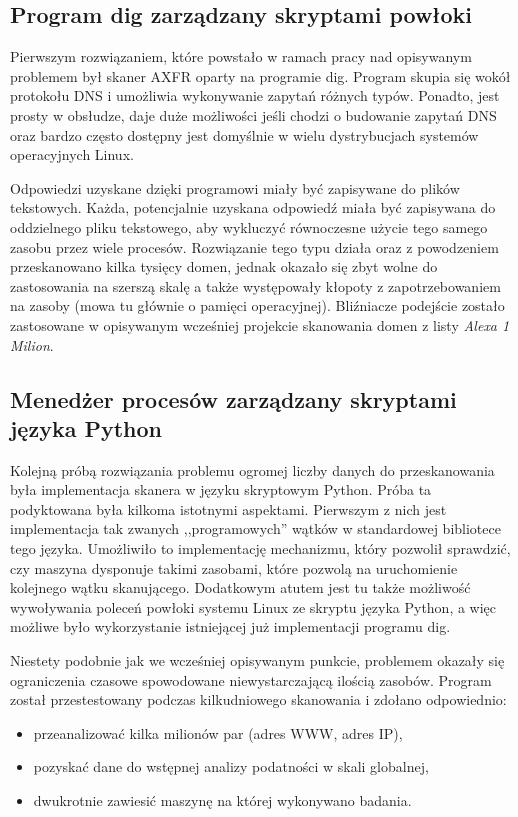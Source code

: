 \subsection{Program dig zarządzany skryptami powłoki}
Pierwszym rozwiązaniem, które powstało w ramach pracy nad opisywanym problemem był skaner AXFR oparty na programie dig\cite{isc}. Program skupia się wokół protokołu DNS i umożliwia wykonywanie zapytań różnych typów\cite{Liu:2006:DB:1197828}. Ponadto, jest prosty w obsłudze, daje duże możliwości jeśli chodzi o budowanie zapytań DNS oraz bardzo często dostępny jest domyślnie w wielu dystrybucjach systemów operacyjnych Linux. 

Odpowiedzi uzyskane dzięki programowi miały być zapisywane do plików tekstowych. Każda, potencjalnie uzyskana odpowiedź miała być zapisywana do oddzielnego pliku tekstowego, aby wykluczyć równoczesne użycie tego samego zasobu przez wiele procesów. Rozwiązanie tego typu działa oraz z powodzeniem przeskanowano kilka tysięcy domen, jednak okazało się zbyt wolne do zastosowania na szerszą skalę a także występowały kłopoty z zapotrzebowaniem na zasoby (mowa tu głównie o pamięci operacyjnej). Bliźniacze podejście zostało zastosowane w opisywanym wcześniej projekcie skanowania domen z listy \textit{Alexa 1 Milion}\cite{scans.io}.

\subsection{Menedżer procesów zarządzany skryptami języka Python}
Kolejną próbą rozwiązania problemu ogromej liczby danych do przeskanowania była implementacja skanera w języku skryptowym Python. Próba ta podyktowana była kilkoma istotnymi aspektami. Pierwszym z nich jest implementacja tak zwanych ,,programowych'' wątków w standardowej bibliotece tego języka. Umożliwiło to implementację mechanizmu, który pozwolił sprawdzić, czy maszyna dysponuje takimi zasobami, które pozwolą na uruchomienie kolejnego wątku skanującego. Dodatkowym atutem jest tu także możliwość wywoływania poleceń powłoki systemu Linux ze skryptu języka Python, a więc możliwe było wykorzystanie istniejącej już implementacji programu dig\cite{isc}.

Niestety podobnie jak we wcześniej opisywanym punkcie, problemem okazały się ograniczenia czasowe spowodowane niewystarczającą ilością zasobów. Program został przestestowany podczas kilkudniowego skanowania i zdołano odpowiednio:
\begin{itemize}
	\item przeanalizować kilka milionów par (adres WWW, adres IP),
	\item pozyskać dane do wstępnej analizy podatności w skali globalnej,
	\item dwukrotnie zawiesić maszynę na której wykonywano badania.
\end{itemize}

